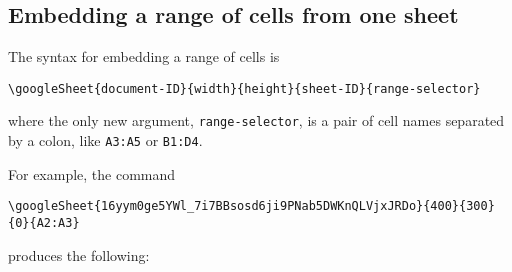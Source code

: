 \documentclass{ximera}
\begin{document}


\subsection{Embedding a range of cells from one sheet}

The syntax for embedding a range of cells is
\begin{verbatim}
\googleSheet{document-ID}{width}{height}{sheet-ID}{range-selector}
\end{verbatim}
where the only new argument, \texttt{range-selector}, is a pair of cell names separated by a colon, like \texttt{A3:A5} or \texttt{B1:D4}.

For example, the command
\begin{verbatim}
\googleSheet{16yym0ge5YWl_7i7BBsosd6ji9PNab5DWKnQLVjxJRDo}{400}{300}{0}{A2:A3}
\end{verbatim}
produces the following:

\end{document}
